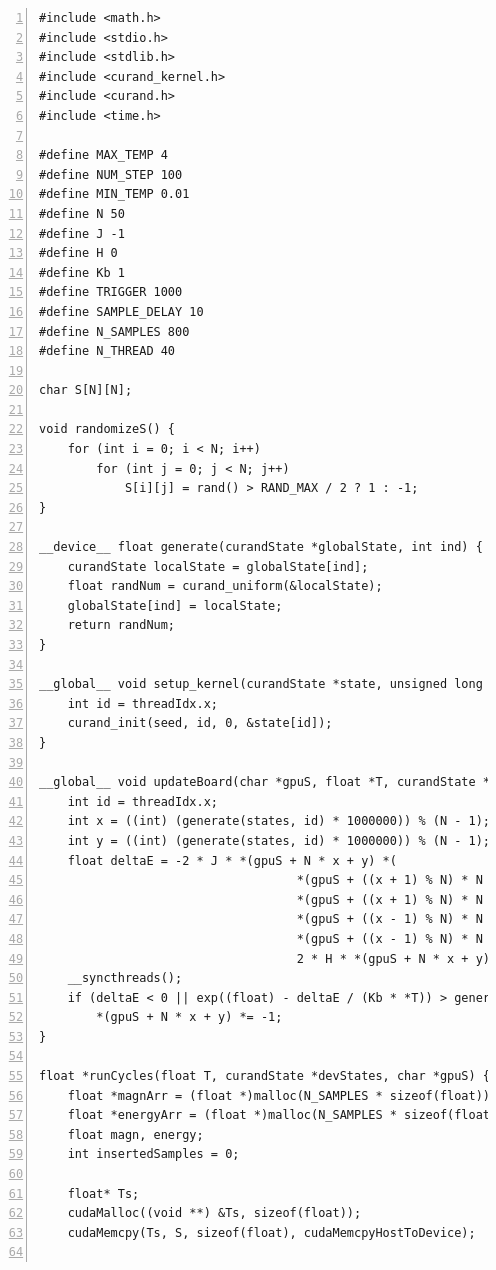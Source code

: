 \documentclass[a4paper,11pt]{article}
\begin{document}
\begin{Verbatim}[numbers=left, frame=single]
#include <math.h>
#include <stdio.h>
#include <stdlib.h>
#include <curand_kernel.h>
#include <curand.h>
#include <time.h>

#define MAX_TEMP 4
#define NUM_STEP 100
#define MIN_TEMP 0.01
#define N 50
#define J -1
#define H 0
#define Kb 1
#define TRIGGER 1000
#define SAMPLE_DELAY 10
#define N_SAMPLES 800
#define N_THREAD 40

char S[N][N];

void randomizeS() {
    for (int i = 0; i < N; i++)
        for (int j = 0; j < N; j++)
            S[i][j] = rand() > RAND_MAX / 2 ? 1 : -1;
}

__device__ float generate(curandState *globalState, int ind) {
    curandState localState = globalState[ind];
    float randNum = curand_uniform(&localState);
    globalState[ind] = localState;
    return randNum;
}

__global__ void setup_kernel(curandState *state, unsigned long seed) {
    int id = threadIdx.x;
    curand_init(seed, id, 0, &state[id]);
}

__global__ void updateBoard(char *gpuS, float *T, curandState *states) {
    int id = threadIdx.x;
    int x = ((int) (generate(states, id) * 1000000)) % (N - 1);
    int y = ((int) (generate(states, id) * 1000000)) % (N - 1);
    float deltaE = -2 * J * *(gpuS + N * x + y) *( 
                                    *(gpuS + ((x + 1) % N) * N + (y + 1) % N) +
                                    *(gpuS + ((x + 1) % N) * N + (y - 1) % N) +
                                    *(gpuS + ((x - 1) % N) * N + (y + 1) % N) +
                                    *(gpuS + ((x - 1) % N) * N + (y - 1) % N)) -
                                    2 * H * *(gpuS + N * x + y);
    __syncthreads();
    if (deltaE < 0 || exp((float) - deltaE / (Kb * *T)) > generate(states, id))
        *(gpuS + N * x + y) *= -1;
}

float *runCycles(float T, curandState *devStates, char *gpuS) {
    float *magnArr = (float *)malloc(N_SAMPLES * sizeof(float));
    float *energyArr = (float *)malloc(N_SAMPLES * sizeof(float));
    float magn, energy;
    int insertedSamples = 0;

    float* Ts;
    cudaMalloc((void **) &Ts, sizeof(float));
    cudaMemcpy(Ts, S, sizeof(float), cudaMemcpyHostToDevice);


\end{Verbatim}
\end{document}
